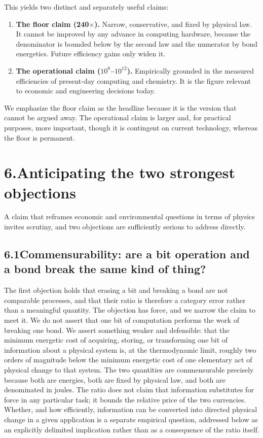 \documentclass[11pt]{article}
\begin{document}
This yields two distinct and separately useful claims:
\begin{enumerate}[topsep=0pt]
\item \textbf{The floor claim (240$\times$).} Narrow, conservative, and fixed by physical law. It cannot be improved by any advance in computing hardware, because the denominator is bounded below by the second law and the numerator by bond energetics. Future efficiency gains only widen it.
\item \textbf{The operational claim ($10^{8}$--$10^{12}$).} Empirically grounded in the measured efficiencies of present-day computing and chemistry. It is the figure relevant to economic and engineering decisions today.
\end{enumerate}
We emphasize the floor claim as the headline because it is the version that cannot be argued away. The operational claim is larger and, for practical purposes, more important, though it is contingent on current technology, whereas the floor is permanent.

\section*{6.\quad Anticipating the two strongest objections}
A claim that reframes economic and environmental questions in terms of physics invites scrutiny, and two objections are sufficiently serious to address directly.

\subsection*{6.1\quad Commensurability: are a bit operation and a bond break the same kind of thing?}
The first objection holds that erasing a bit and breaking a bond are not comparable processes, and that their ratio is therefore a category error rather than a meaningful quantity. The objection has force, and we narrow the claim to meet it. We do not assert that one bit of computation performs the work of breaking one bond. We assert something weaker and defensible: that the minimum energetic cost of acquiring, storing, or transforming one bit of information about a physical system is, at the thermodynamic limit, roughly two orders of magnitude below the minimum energetic cost of one elementary act of physical change to that system. The two quantities are commensurable precisely because both are energies, both are fixed by physical law, and both are denominated in joules. The ratio does not claim that information substitutes for force in any particular task; it bounds the relative price of the two currencies. Whether, and how efficiently, information can be converted into directed physical change in a given application is a separate empirical question, addressed below as an explicitly delimited implication rather than as a consequence of the ratio itself.
\end{document}
